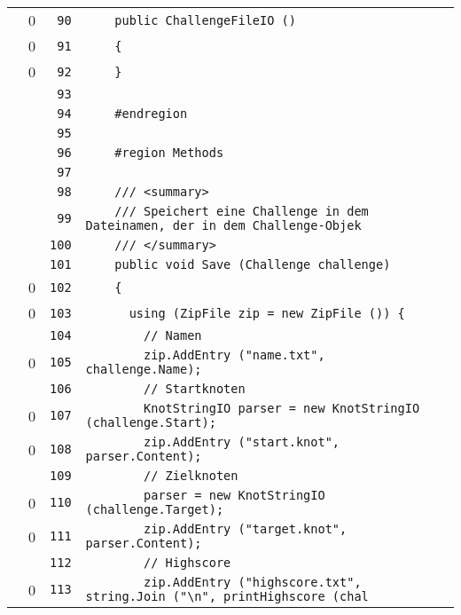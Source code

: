\documentclass[a4paper,10pt]{article}
\begin{document}
\begin{longtable}[l]{lrrl}
\cellcolor{red} & 0 & \verb~90~ & \verb~    public ChallengeFileIO ()~\\
\cellcolor{red} & 0 & \verb~91~ & \verb~    {~\\
\cellcolor{red} & 0 & \verb~92~ & \verb~    }~\\
\cellcolor{gray} &  & \verb~93~ & \verb~~\\
\cellcolor{gray} &  & \verb~94~ & \verb~    #endregion~\\
\cellcolor{gray} &  & \verb~95~ & \verb~~\\
\cellcolor{gray} &  & \verb~96~ & \verb~    #region Methods~\\
\cellcolor{gray} &  & \verb~97~ & \verb~~\\
\cellcolor{gray} &  & \verb~98~ & \verb~    /// <summary>~\\
\cellcolor{gray} &  & \verb~99~ & \verb~    /// Speichert eine Challenge in dem Dateinamen, der in dem Challenge-Objek~\\
\cellcolor{gray} &  & \verb~100~ & \verb~    /// </summary>~\\
\cellcolor{gray} &  & \verb~101~ & \verb~    public void Save (Challenge challenge)~\\
\cellcolor{red} & 0 & \verb~102~ & \verb~    {~\\
\cellcolor{red} & 0 & \verb~103~ & \verb~      using (ZipFile zip = new ZipFile ()) {~\\
\cellcolor{gray} &  & \verb~104~ & \verb~        // Namen~\\
\cellcolor{red} & 0 & \verb~105~ & \verb~        zip.AddEntry ("name.txt", challenge.Name);~\\
\cellcolor{gray} &  & \verb~106~ & \verb~        // Startknoten~\\
\cellcolor{red} & 0 & \verb~107~ & \verb~        KnotStringIO parser = new KnotStringIO (challenge.Start);~\\
\cellcolor{red} & 0 & \verb~108~ & \verb~        zip.AddEntry ("start.knot", parser.Content);~\\
\cellcolor{gray} &  & \verb~109~ & \verb~        // Zielknoten~\\
\cellcolor{red} & 0 & \verb~110~ & \verb~        parser = new KnotStringIO (challenge.Target);~\\
\cellcolor{red} & 0 & \verb~111~ & \verb~        zip.AddEntry ("target.knot", parser.Content);~\\
\cellcolor{gray} &  & \verb~112~ & \verb~        // Highscore~\\
\cellcolor{red} & 0 & \verb~113~ & \verb~        zip.AddEntry ("highscore.txt", string.Join ("\n", printHighscore (chal~\\

\end{longtable}
\end{document}
